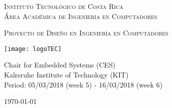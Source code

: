 
\thispagestyle{empty} 

\begin{center}

\textsc{\LARGE Instituto Tecnol\'ogico de Costa Rica} \\
\textsc{\Large \'Area Acad\'emica de Ingenier\'ia en Computadores}

\textsc{\Large Proyecto de Dise\~no en Ingenier\'ia en Computadores}


\par\vspace{20mm}

\texttt{[image: logoTEC]}

\par\vspace*{\fill}

{\LARGE\bf{\textsf{ \Huge \scriptTitle}}}

\par\vspace*{\fill}

Chair for Embedded Systems (CES) \\
Kalrsruhe Institute of Technology (KIT) \\
Period: 05/03/2018 (week 5) - 16/03/2018 (week 6) 

\par\vspace{20mm}

\textsc{\Large \scriptAuthor}

\vspace*{\fill}

{\today}

\end{center}
\newpage 
\cleardoublepage  
